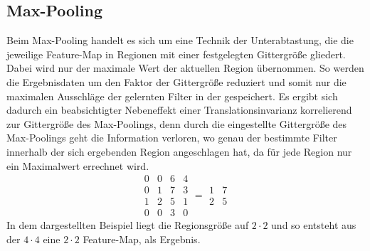 \subsection{Max-Pooling}
Beim Max-Pooling handelt es sich um eine Technik der Unterabtastung, die die jeweilige Feature-Map in Regionen mit einer festgelegten Gittergröße gliedert. 
Dabei wird nur der maximale Wert der aktuellen Region übernommen.
So werden die Ergebnisdaten um den Faktor der Gittergröße reduziert und somit nur die maximalen Ausschläge der gelernten Filter in der gespeichert.
Es ergibt sich dadurch ein beabsichtigter Nebeneffekt einer Translationsinvarianz korrelierend zur Gittergröße des Max-Poolings, denn durch die eingestellte Gittergröße des Max-Poolings geht die Information verloren, wo genau der bestimmte Filter innerhalb der sich ergebenden Region angeschlagen hat, da für jede Region nur ein Maximalwert errechnet wird.\newline
\begin{equation*}
\begin{matrix}
 0 & 0 & 6 & 4 \\
 0 & 1 & 7 & 3 \\
 1 & 2 & 5 & 1 \\
 0 & 0 & 3 & 0
\end{matrix} =
\begin{matrix}
 1 & 7 \\
 2 & 5  
\end{matrix}
\end{equation*}
In dem dargestellten Beispiel liegt die Regionsgröße auf $2 \cdot 2$ und so entsteht aus der $4 \cdot 4$ eine $2 \cdot 2$ Feature-Map, als Ergebnis.  


